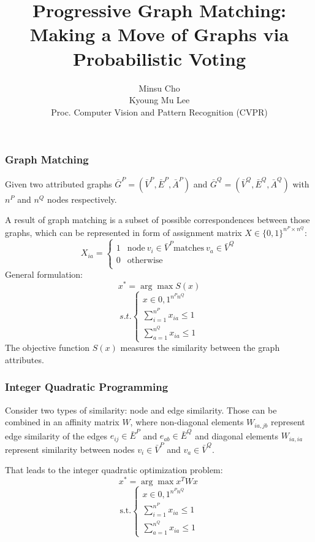 \documentclass[hyperref={pdfpagelabels=false}]{beamer}
\title{{P}rogressive {G}raph {M}atching:\\
		{M}aking a {M}ove of {G}raphs via {P}robabilistic {V}oting}
\author{Minsu Cho\\
		Kyoung Mu Lee\\
		\vspace{20pt}
		Proc. Computer Vision and Pattern Recognition (CVPR) \text{2012}}
\date{}
\begin{document}
\begin{frame}
\titlepage
\end{frame}
\begin{frame}
\frametitle{Graph Matching}
Given two attributed graphs $\bar{G}^P=(\bar{V}^P, \bar{E}^P, \bar{A}^P)$ and $\bar{G}^Q=(\bar{V}^Q, \bar{E}^Q, \bar{A}^Q)$ with $n^P$ and $n^Q$ nodes respectively.

A result of graph matching is a subset of possible correspondences between those graphs, which can be represented in form of assignment matrix $X\in\{0,1\}^{n^P\times n^Q}$:
$$X_{ia} = \begin{cases} 1 & \mbox{node}\ v_i\in \bar{V}^P \mbox{matches}\ v_a \in \bar{V}^Q \\
						 0 & \mbox{otherwise} \\
			\end{cases}$$
General formulation:
$$x^* = \arg\max S(x)$$
$$ s.t. \begin{cases}
									x\in{0,1}^{n^Pn^Q} \\
								 \sum_{i=1}^{n^P}x_{ia}\le 1 \\
								 \sum_{a=1}^{n^Q}x_{ia}\le 1  \end{cases}$$
The objective function $S(x)$ measures the similarity between the graph attributes. 
\end{frame} 

\begin{frame}
\frametitle{Integer Quadratic Programming}

Consider two types of similarity: node and edge similarity. Those can be combined in an affinity matrix $W$, where non-diagonal elements $W_{ia,jb}$ represent edge similarity of the edges $e_{ij}\in \bar{E}^P$ and $e_{ab}\in \bar{E}^Q$ and diagonal elements $W_{ia,ia}$ represent similarity between nodes $v_i\in \bar{V}^P$ and $v_a\in \bar{V}^Q$.

That leads to the integer quadratic optimization problem:\\
$$x^* = \arg\max x^TWx\ $$
$$\mbox{s.t}. \begin{cases}
					x\in{0,1}^{n^Pn^Q} \\
					\sum_{i=1}^{n^P}x_{ia}\le 1 \\
					\sum_{a=1}^{n^Q}x_{ia}\le 1  \end{cases}$$
\end{frame}
\end{document}
